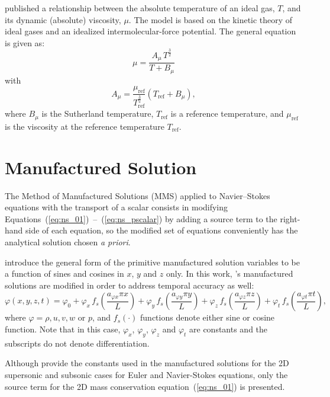\documentclass[10pt]{article}
\begin{document}
\citet{Sutherland1893} published a relationship between the absolute temperature of an ideal gas, $T$,  and its dynamic (absolute) viscosity, $\mu$. The model is based on the kinetic theory of ideal gases and an idealized intermolecular-force potential. The general equation is given as:
\begin{equation}
\label{eq:Sutherland01}
 \mu  =\dfrac{A_\mu \, T^{\frac{3}{2}}}{T+B_\mu}
\end{equation}
with
$$    A_\mu = \dfrac{\mu_\text{ref}}{T_{\text{ref}}^{\frac{3}{2}}}(T_\text{ref} + B_\mu), $$
%
where $B_\mu$ is the Sutherland temperature, $T_{\text{ref}}$ is a reference temperature,  and $\mu_\text{ref}$ is the viscosity at the reference temperature $T_\text{ref}$.


\section{Manufactured Solution}

The Method of Manufactured Solutions (MMS) applied to Navier--Stokes equations with the transport of a scalar consists in modifying Equations~(\ref{eq:ns_01})~--~(\ref{eq:ns_pscalar}) by adding a source term to the right-hand side of each equation, so the modified set of equations conveniently has the analytical solution chosen \textit{a priori}.

\citet{Roy2002} introduce the general form of the primitive manufactured solution variables to be  a function of sines and cosines in $x$, $y$ and $z$ only. In this work, \citet{Roy2002}'s manufactured solutions are modified in order to address temporal accuracy as well:
\begin{equation}
 \label{eq:manufactured01}
  \varphi (x,y,z,t) = \varphi_0+ \varphi_x\, f_s \left(\frac{a_{\varphi x} \pi x}{L} \right) +  \varphi_y \,f_s\left(\frac{a_{\varphi y} \pi y}{L}\right) + \varphi_z \,f_s\left(\frac{a_{\varphi z} \pi z}{L}\right)+ \varphi_t \,f_s\left(\frac{a_{\varphi t} \pi t}{L}\right),
\end{equation}
where $\varphi=\rho,u,v,w$ or $p$, and $f_s(\cdot)$ functions denote either sine or cosine function. Note that in this case, $\varphi_x$, $\varphi_y$, $\varphi_z$  and $\varphi_t$ are constants  and the subscripts do not denote differentiation.



Although \citet{Roy2002} provide the constants used in the manufactured solutions for the 2D supersonic and subsonic cases for Euler and Navier-Stokes equations, only the source term for the 2D mass conservation equation~(\ref{eq:ns_01}) is presented.
\end{document}

